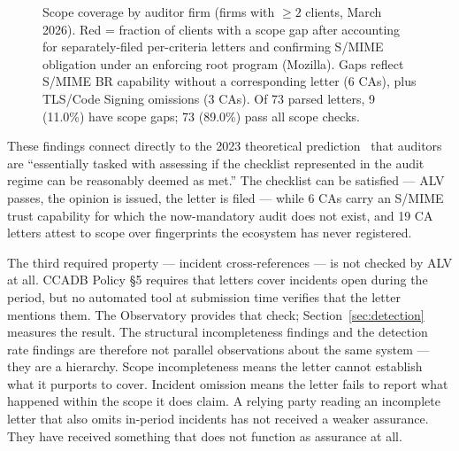 \documentclass[10pt,twocolumn,letterpaper]{article}
\begin{document}
\begin{figure}[t]
\centering
{}
\caption{Scope coverage by auditor firm (firms with $\geq 2$ clients,
March 2026). Red = fraction of clients with a scope gap after accounting
for separately-filed per-criteria letters and confirming S/MIME obligation
under an enforcing root program (Mozilla). Gaps reflect S/MIME BR
capability without a corresponding letter (6 CAs), plus TLS/Code Signing
omissions (3 CAs). Of 73 parsed letters, 9 (11.0\%) have scope gaps; 73 (89.0\%) pass
all scope checks.}
\label{fig:alv}
\end{figure}

These findings connect directly to the 2023 theoretical
prediction~\cite{hurst2023} that auditors are ``essentially tasked
with assessing if the checklist represented in the audit regime can
be reasonably deemed as met.'' The checklist can be satisfied ---
ALV passes, the opinion is issued, the letter is filed --- while
6 CAs carry an S/MIME trust capability for which the now-mandatory
audit does not exist, and 19 CA letters attest to scope over fingerprints
the ecosystem has never registered.

The third required property --- incident cross-references --- is not
checked by ALV at all. CCADB Policy \S5 requires that letters cover
incidents open during the period, but no automated tool at submission
time verifies that the letter mentions them. The Observatory provides
that check; Section~\ref{sec:detection} measures the result. The
structural incompleteness findings and the detection rate findings
are therefore not parallel observations about the same system ---
they are a hierarchy. Scope incompleteness means the letter cannot
establish what it purports to cover. Incident omission
means the letter fails to report what happened within the scope it
does claim. A relying party reading an incomplete letter that also
omits in-period incidents has not received a weaker assurance. They
have received something that does not function as assurance at all.
\end{document}
